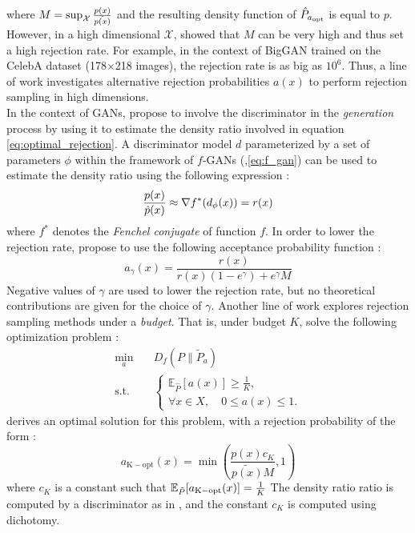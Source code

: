 where $M = \sup_{\mathcal{X}} \frac{p(x)}{\Tilde{p(x)}}$ and the resulting density function of $\Hat{P}_{a_{\mathrm{opt}}}$ is equal to $p$. However, in a high dimensional $\mathcal{X}$, \citep{mackay2003information} showed that $M$ can be very high and thus set a high rejection rate. For example, in the context of BigGAN \citep{brock2019largescalegantraining} trained on the CelebA dataset \citep{liu2015faceattributes} (178×218 images), the rejection rate is as big as $10^{6}$. Thus, a line of work investigates alternative rejection probabilities $a(x)$ to perform rejection sampling in high dimensions.
\\
In the context of GANs, \citep{azadi2019discriminatorrejectionsampling} propose to involve the discriminator in the \textit{generation} process by using it to estimate the density ratio involved in equation \ref{eq:optimal_rejection}. A discriminator model $d$ parameterized by a set of parameters $\phi$ within the framework of $f$-GANs (\citep{nowozin2016fgantraininggenerativeneural},\ref{eq:f_gan}) can be used to estimate the density ratio using the following expression \citep{verine2024precision}: 
\begin{equation}\label{eq:discriminator_density_ratio}
    \frac{p(x)}{\Hat{p}(x)} \approx \nabla f^{*}(d_{\phi}(x)) = r(x)
\end{equation}
where $f^{*}$ denotes the \textit{Fenchel conjugate} of function $f$. In order to lower the rejection rate, \citep{azadi2019discriminatorrejectionsampling} propose to use the following acceptance probability function : 
\begin{equation}\label{eq:acceptance_bounded}
    a_{\gamma}(x) = \frac{r(x)}{r(x)(1-e^{\gamma}) + e^{\gamma}M}
\end{equation}
Negative values of $\gamma$ are used to lower the rejection rate, but no theoretical contributions are given for the choice of $\gamma$. 
Another line of work explores rejection sampling methods under a \textit{budget}. That is, under budget $K$, solve the following optimization problem : 
\begin{align*}\label{eq:budget_rejection_prob}
\min_a \quad & D_f(P \parallel \tilde{P}_a) \\
\text{s.t.} \quad & 
\begin{cases} 
\mathbb{E}_{\hat{P}}[a(x)] \geq \frac{1}{K}, \\
\forall x \in X, \quad 0 \leq a(x) \leq 1.
\end{cases}
\end{align*}
\citep{verine2024optimalbudgetedrejectionsampling} derives an optimal solution for this problem, with a rejection probability of the form : 
\begin{equation}
    a_{\mathrm{K-opt}}(x) = \min \left(\frac{p(x)c_{K}}{\tilde{p(x)}M},1\right)
\end{equation}
where $c_K$ is a constant such that $\mathbb{E}_{\Tilde{P}}[a_{\mathrm{K-opt}}(x)] = \frac{1}{K}$
The density ratio ratio is computed by a discriminator as in \citep{azadi2019discriminatorrejectionsampling}, and the constant $c_{K}$ is computed using dichotomy.

